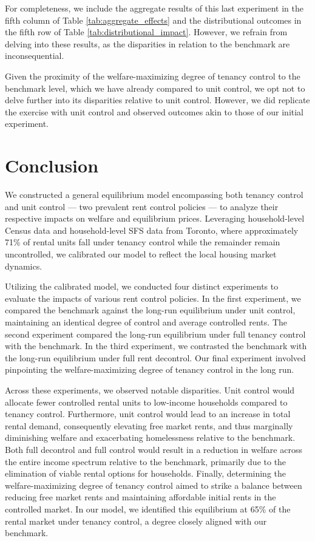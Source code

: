 \documentclass[parskip=full]{article}
\begin{document}
For completeness, we include the aggregate results of this last experiment in the fifth column of Table \ref{tab:aggregate_effects} and the distributional outcomes in the fifth row of Table \ref{tab:distributional_impact}. However, we refrain from delving into these results, as the disparities in relation to the benchmark are inconsequential.

Given the proximity of the welfare-maximizing degree of tenancy control to the benchmark level, which we have already compared to unit control, we opt not to delve further into its disparities relative to unit control. However, we did replicate the exercise with unit control and observed outcomes akin to those of our initial experiment.

\section{Conclusion}\label{sec:conclusion}

We constructed a general equilibrium model encompassing both tenancy control and unit control --- two prevalent rent control policies --- to analyze their respective impacts on welfare and equilibrium prices. Leveraging household-level Census data and household-level SFS data from Toronto, where approximately 71\% of rental units fall under tenancy control while the remainder remain uncontrolled, we calibrated our model to reflect the local housing market dynamics.

Utilizing the calibrated model, we conducted four distinct experiments to evaluate the impacts of various rent control policies. In the first experiment, we compared the benchmark against the long-run equilibrium under unit control, maintaining an identical degree of control and average controlled rents. The second experiment compared the long-run equilibrium under full tenancy control with the benchmark. In the third experiment, we contrasted the benchmark with the long-run equilibrium under full rent decontrol. Our final experiment involved pinpointing the welfare-maximizing degree of tenancy control in the long run.

Across these experiments, we observed notable disparities. Unit control would allocate fewer controlled rental units to low-income households compared to tenancy control. Furthermore, unit control would lead to an increase in total rental demand, consequently elevating free market rents, and thus marginally diminishing welfare and exacerbating homelessness relative to the benchmark. Both full decontrol and full control would result in a reduction in welfare across the entire income spectrum relative to the benchmark, primarily due to the elimination of viable rental options for households. Finally, determining the welfare-maximizing degree of tenancy control aimed to strike a balance between reducing free market rents and maintaining affordable initial rents in the controlled market. In our model, we identified this equilibrium at 65\% of the rental market under tenancy control, a degree closely aligned with our benchmark.
\end{document}
